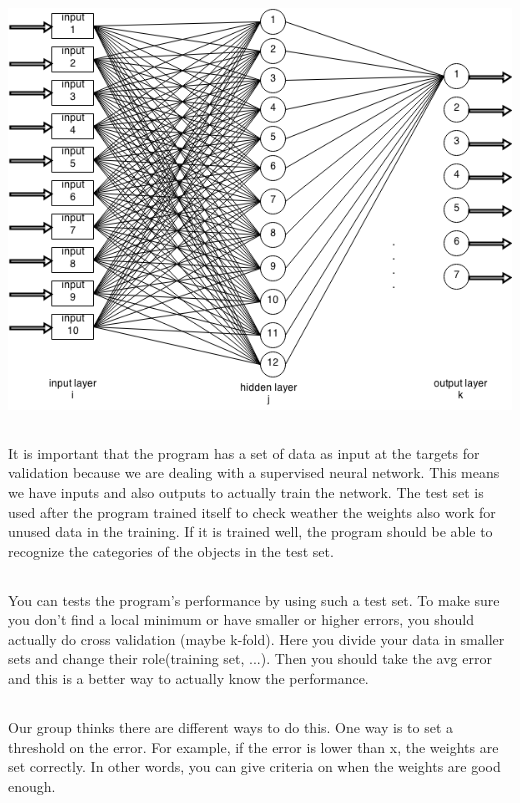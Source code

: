 \documentclass{scrartcl}
\begin{document}
  \subsection{}
  \includegraphics[scale = 0.7]{network.png}
  
  \subsection{}
  It is important that the program has a set of data as input at the targets for validation because we are dealing with a supervised neural network. This means we have inputs and also outputs to actually train the network. The test set is used after the program trained itself to check weather the weights also work for unused data in the training. If it is trained well, the program should be able to recognize the categories of the objects in the test set.
  
  \subsection{}
  You can tests the program's performance by using such a test set. To make sure you don't find a local minimum or have smaller or higher errors, you should actually do cross validation (maybe k-fold). Here you divide your data in smaller sets and change their role(training set, ...). Then you should take the avg error and this is a better way to actually know the performance.
  
  \subsection{}
  Our group thinks there are different ways to do this. One way is to set a threshold on the error. For example, if the error is lower than x, the weights are set correctly. In other words, you can give criteria on when the weights are good enough.
  
\end{document}
